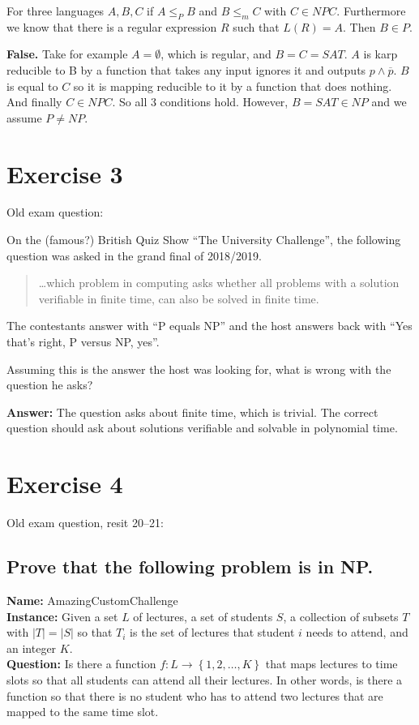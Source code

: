 \documentclass[a4paper,11pt]{article}
\newcommand{\set}[1]{\left\{ #1 \right\}}
\begin{document}
	For three languages $A, B, C$ if $A \leq_P B$ and $B \leq_m C$ with $C \in NPC$. Furthermore we know that there is a regular expression $R$ such that $L(R)=A$. Then $B \in P$.

	\textbf{False. }Take for example $A=\emptyset$, which is regular, and $B=C=SAT$. $A$ is karp reducible to B by a function that takes any input ignores it and outputs $p\wedge\overline{p}$. $B$ is equal to $C$ so it is mapping reducible to it by a function that does nothing. And finally $C\in NPC$. So all 3 conditions hold. However, $B=SAT\in NP$ and we assume $P\neq NP$.

	\section{Exercise 3}
	Old exam question:

	On the (famous?) British Quiz Show ``The University Challenge'', the following question was asked in the grand final of 2018/2019.

	\begin{quote}
		\ldots which problem in computing asks whether all problems with a solution verifiable in finite time, can also be solved in finite time.
	\end{quote}

	The contestants answer with ``P equals NP'' and the host answers back with ``Yes that's right, P versus NP, yes''.

	Assuming this is the answer the host was looking for, what is wrong with the question he asks?

	\textbf{Answer: }The question asks about finite time, which is trivial. The correct question should ask about solutions verifiable and solvable in polynomial time.

	\section{Exercise 4}
	Old exam question, resit 20--21:

	\subsection{Prove that the following problem is in NP.}

	\textbf{Name:} AmazingCustomChallenge\\
	\textbf{Instance:} Given a set $L$ of lectures, a set of students $S$, a collection of subsets $T$ with $|T|=|S|$ so that $T_i$ is the set of lectures that student $i$ needs to attend, and an integer $K$.\\
	\textbf{Question:} Is there a function $f:L \to \set{1,2,\dots,K}$ that maps lectures to time slots so that all students can attend all their lectures. In other words, is there a function so that there is no student who has to attend two lectures that are mapped to the same time slot.
\end{document}
